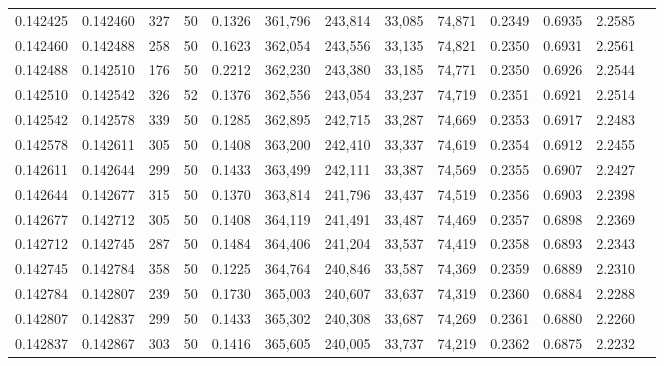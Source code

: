 \begin{tabular}{rrrrrrrrrrrrr}
0.142425 & 0.142460 &   327 &  50 &                                     0.1326 & 361,796 & 243,814 &  33,085 &  74,871 & 0.2349 & 0.6935 & 2.2585 \\
0.142460 & 0.142488 &   258 &  50 &                                     0.1623 & 362,054 & 243,556 &  33,135 &  74,821 & 0.2350 & 0.6931 & 2.2561 \\
0.142488 & 0.142510 &   176 &  50 &                                     0.2212 & 362,230 & 243,380 &  33,185 &  74,771 & 0.2350 & 0.6926 & 2.2544 \\
0.142510 & 0.142542 &   326 &  52 &                                     0.1376 & 362,556 & 243,054 &  33,237 &  74,719 & 0.2351 & 0.6921 & 2.2514 \\
0.142542 & 0.142578 &   339 &  50 &                                     0.1285 & 362,895 & 242,715 &  33,287 &  74,669 & 0.2353 & 0.6917 & 2.2483 \\
0.142578 & 0.142611 &   305 &  50 &                                     0.1408 & 363,200 & 242,410 &  33,337 &  74,619 & 0.2354 & 0.6912 & 2.2455 \\
0.142611 & 0.142644 &   299 &  50 &                                     0.1433 & 363,499 & 242,111 &  33,387 &  74,569 & 0.2355 & 0.6907 & 2.2427 \\
0.142644 & 0.142677 &   315 &  50 &                                     0.1370 & 363,814 & 241,796 &  33,437 &  74,519 & 0.2356 & 0.6903 & 2.2398 \\
0.142677 & 0.142712 &   305 &  50 &                                     0.1408 & 364,119 & 241,491 &  33,487 &  74,469 & 0.2357 & 0.6898 & 2.2369 \\
0.142712 & 0.142745 &   287 &  50 &                                     0.1484 & 364,406 & 241,204 &  33,537 &  74,419 & 0.2358 & 0.6893 & 2.2343 \\
0.142745 & 0.142784 &   358 &  50 &                                     0.1225 & 364,764 & 240,846 &  33,587 &  74,369 & 0.2359 & 0.6889 & 2.2310 \\
0.142784 & 0.142807 &   239 &  50 &                                     0.1730 & 365,003 & 240,607 &  33,637 &  74,319 & 0.2360 & 0.6884 & 2.2288 \\
0.142807 & 0.142837 &   299 &  50 &                                     0.1433 & 365,302 & 240,308 &  33,687 &  74,269 & 0.2361 & 0.6880 & 2.2260 \\
0.142837 & 0.142867 &   303 &  50 &                                     0.1416 & 365,605 & 240,005 &  33,737 &  74,219 & 0.2362 & 0.6875 & 2.2232 \\

\end{tabular}
